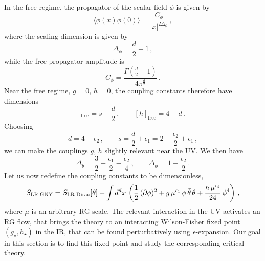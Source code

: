 \documentclass[aps,amsmath,amssymb,prd,showpacs,floatfix,preprint,superscriptaddress,nofootinbib,12pt]{article}
\begin{document}
In the free regime, the propagator of the scalar field $\phi$ is given by
\begin{equation}
\label{free <phi phi>}
\langle \phi(x)\phi(0)\rangle = \frac{C_\phi}{|x|^{2\Delta_\phi}}\,,
\end{equation}
where the scaling dimension is given by
\begin{equation}
\Delta_\phi = \frac{d}{2} - 1\,,
\end{equation}
while the free propagator amplitude is
\begin{equation}
C_\phi = \frac{\Gamma\left(\frac{d}{2}-1\right)}{4\pi^\frac{d}{2}}\,.
\end{equation}
Near the free regime, $g=0$, $h=0$, the coupling constants
therefore have dimensions
\begin{equation}
[g]_{\textrm{free}} = s-\frac{d}{2}\,,\qquad
[h]_{\textrm{free}} = 4-d\,.
\end{equation}
Choosing
\begin{equation}
\label{d and s in terms of epsilon12}
d = 4-\epsilon_2\,,\qquad s = \frac{d}{2} + \epsilon_1 = 2-\frac{\epsilon_2}{2}+\epsilon_1\,,
\end{equation}
we can make the couplings $g$, $h$ slightly relevant near the UV.
We then have
\begin{equation}
\label{Delta theta and phi in terms of epsilon12}
\Delta_\theta = \frac{3}{2} - \frac{\epsilon_1}{2} - \frac{\epsilon_2}{4}\,,\qquad
\Delta_\phi = 1 - \frac{\epsilon_2}{2}\,.
\end{equation}
Let us now redefine the coupling constants to be dimensionless, 
\begin{equation}
\label{LR GNY action redef gh}
S_{\textrm{LR\;GNY}}=S_{\textrm{LR\;Dirac}}[\theta] 
+\int d^dx\,\left(\frac{1}{2}\,(\partial\phi)^2 + g \,\mu^{\epsilon_1}\,\phi\, \bar\theta\,\theta+\frac{h\,\mu^{\epsilon_2}}
{24}\,\phi^4\right)\,,
\end{equation}
where $\mu$ is an arbitrary RG scale.
The relevant interaction in the UV activates
an RG flow, that brings the theory to an interacting Wilson-Fisher fixed point $(g_\star, h_\star)$
in the IR, that can be found perturbatively using $\epsilon$-expansion.
Our goal in this section is to find this fixed point and study the corresponding critical theory.
\end{document}
